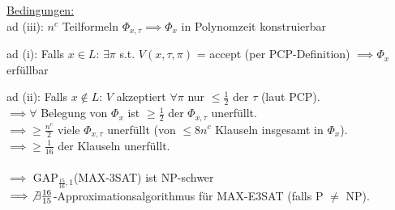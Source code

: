\underline{Bedingungen:}
\\
ad (iii): $n^c$ Teilformeln $\Phi_{x, \tau} \implies \Phi_x$ in Polynomzeit konstruierbar

ad (i): Falls $x \in L$:
$\exists \pi$ s.t. $V(x,\tau,\pi)$ = accept (per PCP-Definition)
$\implies \Phi_x$ erfüllbar

ad (ii): Falls $x \notin L$:
$V$ akzeptiert $\forall \pi$ nur $\leq \frac{1}{2}$ der $\tau$ (laut PCP). \\
$\implies \forall$ Belegung von $\Phi_x$ ist $\geq \frac{1}{2}$ der $\Phi_{x, \tau}$ unerfüllt. \\
$\implies \geq \frac{n^c}{2}$ viele $\Phi_{x, \tau}$ unerfüllt (von $\leq 8n^c$ Klauseln insgesamt in $\Phi_x$). \\
$\implies \geq \frac{1}{16}$ der Klauseln unerfüllt.
\\
\\
$\implies$ GAP$_{\frac{15}{16}, 1}$(MAX-3SAT) ist NP-schwer
\\
$\implies \not \exists \frac{16}{15}$-Approximationsalgorithmus für MAX-E3SAT (falls P $\neq$ NP).
